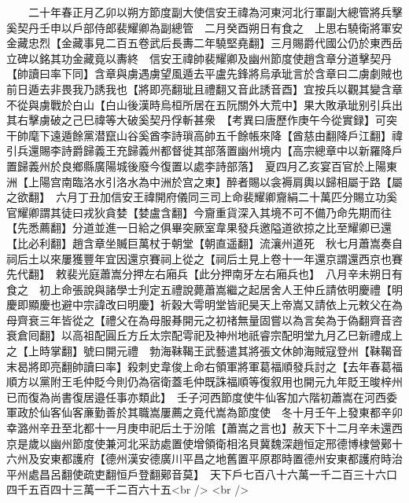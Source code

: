　　二十年春正月乙卯以朔方節度副大使信安王禕為河東河北行軍副大總管將兵擊奚契丹壬申以戶部侍郎裴耀卿為副總管　二月癸酉朔日有食之　上思右驍衛將軍安金藏忠烈【金藏事見二百五卷武后長夀二年驍堅堯翻】三月賜爵代國公仍於東西岳立碑以銘其功金藏竟以夀終　信安王禕帥裴耀卿及幽州節度使趙含章分道擊契丹【帥讀曰率下同】含章與虜遇虜望風遁去平盧先鋒將烏承玼言於含章曰二虜劇賊也前日遁去非畏我乃誘我也【將即亮翻玼且禮翻又音此誘音酉】宜按兵以觀其變含章不從與虜戰於白山【白山後漢時烏桓所居在五阮關外大荒中】果大敗承玼别引兵出其右擊虜破之己巳禕等大破奚契丹俘斬甚衆　【考異曰唐歷作庚午今從實録】可突干帥麾下遠遁餘黨潜竄山谷奚酋李詩瑣高帥五千餘帳來降【酋慈由翻降戶江翻】禕引兵還賜李詩爵歸義王充歸義州都督徙其部落置幽州境内【高宗總章中以新羅降戶置歸義州於良鄉縣廣陽城後廢今復置以處李詩部落】　夏四月乙亥宴百官於上陽東洲【上陽宫南臨洛水引洛水為中洲於宫之東】醉者賜以衾褥肩輿以歸相屬于路【屬之欲翻】　六月丁丑加信安王禕開府儀同三司上命裴耀卿齎絹二十萬匹分賜立功奚官耀卿謂其徒曰戎狄貪婪【婪盧含翻】今齎重貨深入其境不可不備乃命先期而往【先悉薦翻】分道並進一日給之俱畢突厥室韋果發兵邀隘道欲掠之比至耀卿已還【比必利翻】趙含章坐贓巨萬杖于朝堂【朝直遥翻】流瀼州道死　秋七月蕭嵩奏自祠后土以來屢獲豐年宜因還京賽祠上從之【祠后土見上卷十一年還京謂還西京也賽先代翻】　敕裴光庭蕭嵩分押左右廂兵【此分押南牙左右廂兵也】　八月辛未朔日有食之　初上命張說與諸學士刋定五禮說薨蕭嵩繼之起居舍人王仲丘請依明慶禮【明慶即顯慶也避中宗諱改曰明慶】祈穀大雩明堂皆祀昊天上帝嵩又請依上元敕父在為母齊衰三年皆從之【禮父在為母服朞開元之初禇無量固嘗以為言矣為于偽翻齊音咨衰倉囘翻】以高祖配圓丘方丘太宗配雩祀及神州地祇睿宗配明堂九月乙巳新禮成上之【上時掌翻】號曰開元禮　勃海靺鞨王武藝遣其將張文休帥海賊寇登州【靺鞨音末曷將即亮翻帥讀曰率】殺刺史韋俊上命右領軍將軍葛福順發兵討之【去年春葛福順方以黨附王毛仲貶今則仍為宿衛蓋毛仲既誅福順等復叙用也開元九年貶王晙梓州已而復為尚書復居邉任事亦類此】　壬子河西節度使牛仙客加六階初蕭嵩在河西委軍政於仙客仙客亷勤善於其職嵩屢薦之竟代嵩為節度使　冬十月壬午上發東都辛卯幸潞州辛丑至北都十一月庚申祀后土于汾隂【蕭嵩之言也】赦天下十二月辛未還西京是歲以幽州節度使兼河北采訪處置使增領衛相洺貝冀魏深趙恒定邢德博棣營鄚十六州及安東都護府【德州漢安德廣川平昌之地舊置平原郡時置德州安東都護府時治平州處昌呂翻使疏吏翻恒戶登翻鄚音莫】　天下戶七百八十六萬一千二百三十六口四千五百四十三萬一千二百六十五<br />
<br />

